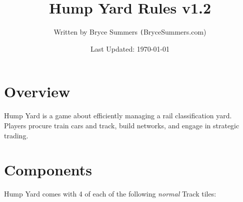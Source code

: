 \documentclass[12pt, letterpaper]{article}
\begin{document}
\title{\color{blue}Hump Yard Rules v1.2}
\author{Written by Bryce Summers \texttt(BryceSummers.com)}
\date{\color{red}Last Updated: \today}
\maketitle

\tableofcontents 

\section{Overview}

Hump Yard is a game about efficiently managing a rail classification yard. Players procure train cars and track, build networks, and engage in strategic trading.

\newpage
\section{Components}

Hump Yard comes with 4 of each of the following \textit{normal} Track tiles:
\end{document}

